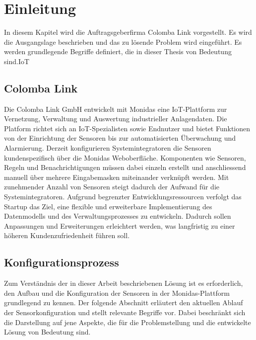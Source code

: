 \section{Einleitung}
\label{kap:ein}
\newcommand{\br}[1]{\textbf{\textcolor{red}{#1}}}
\newcommand{\strike}[1]{\sout{#1}}
\newcommand{\st}[1]{\sout{#1}}

In diesem Kapitel wird die Auftragsgeberfirma Colomba Link vorgestellt. Es wird die Ausgangslage beschrieben und das zu lösende Problem wird eingeführt. Es werden grundlegende Begriffe definiert, die in dieser Thesis von Bedeutung sind.\gls{IoT}

\subsection{Colomba Link}
Die Colomba Link GmbH entwickelt mit Monidas eine IoT-Plattform zur Vernetzung, Verwaltung und Auswertung industrieller Anlagendaten. Die Platform richtet sich an IoT-Spezialisten sowie Endnutzer und bietet Funktionen von der Einrichtung der Sensoren bis zur automatisierten Überwachung und Alarmierung. Derzeit konfigurieren Systemintegratoren die Sensoren kundenspezifisch über die Monidas Weboberfläche. Komponenten wie Sensoren, Regeln und Benachrichtigungen müssen dabei einzeln erstellt und anschliessend manuell über mehrere Eingabemasken miteinander verknüpft werden. Mit zunehmender Anzahl von Sensoren steigt dadurch der Aufwand für die Systemintegratoren. Aufgrund begrenzter Entwicklungsressourcen verfolgt das Startup das Ziel, eine flexible und erweiterbare Implementierung des Datenmodells und des Verwaltungsprozesses zu entwickeln. Dadurch sollen Anpassungen und Erweiterungen erleichtert werden, was langfristig zu einer höheren Kundenzufriedenheit führen soll.

\subsection{Konfigurationsprozess}
\label{kap:konf}
Zum Verständnis der in dieser Arbeit beschriebenen Lösung ist es erforderlich, den Aufbau und die Konfiguration der Sensoren in der Monidas-Plattform grundlegend zu kennen. Der folgende Abschnitt erläutert den aktuellen Ablauf der Sensorkonfiguration und stellt relevante Begriffe vor. Dabei beschränkt sich die Darstellung auf jene Aspekte, die für die Problemstellung und die entwickelte Lösung von Bedeutung sind.

